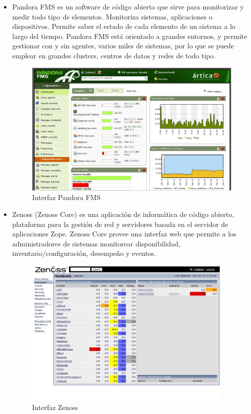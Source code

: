 \documentclass[11pt,a4paper]{article}
\begin{document}
\begin{itemize}

\item Pandora FMS\cite{web-PandoraFMS} es un software de código abierto que sirve para monitorizar y medir todo tipo de elementos. Monitoriza sistemas, aplicaciones o dispositivos. Permite saber el estado de cada elemento de un sistema a lo largo del tiempo. Pandora FMS está orientado a grandes entornos, y permite gestionar con y sin agentes, varios miles de sistemas, por lo que se puede emplear en grandes clusters, centros de datos y redes de todo tipo.

\begin{figure}[hbtp]
\centerline{\includegraphics[width=10 cm]{images/pandoraFMS.png}}
\caption{Interfaz Pandora FMS}
\label{PandoraFMS}
\end{figure}


\item Zenoss (Zenoss Core)\cite{web-Zenoss} es una aplicación de informática de código abierto, plataforma para la gestión de red y servidores basada en el servidor de aplicaciones Zope. Zenoss Core provee una interfaz web que permite a los administradores de sistemas monitorear disponibilidad, inventario/configuración, desempeño y eventos.

\begin{figure}[hbtp]
\centerline{\includegraphics[width=10cm]{images/Zenossscreen.jpg}}
\caption{Interfaz Zenoss}
\label{Zenoss}
\end{figure}

\end{itemize}
    
\end{document}
